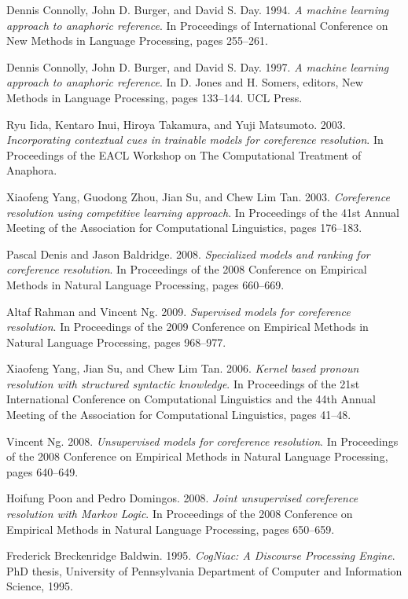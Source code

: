 \documentclass[12pt]{report}
\begin{document}
\begin{thebibliography}{30}
	Dennis Connolly, John D. Burger, and David S. Day. 1994.
	\textit{A machine learning approach to anaphoric reference}.
	In Proceedings of International Conference on New Methods in Language Processing, pages 255–261.

	Dennis Connolly, John D. Burger, and David S. Day. 1997.
	\textit{A machine learning approach to anaphoric reference}.
	In D. Jones and H. Somers, editors, New Methods in Language Processing, pages 133–144. UCL Press.

	Ryu Iida, Kentaro Inui, Hiroya Takamura, and Yuji Matsumoto. 2003.
	\textit{Incorporating contextual cues in trainable models for coreference resolution}.
	In Proceedings of the EACL Workshop on The Computational Treatment of Anaphora.

	Xiaofeng Yang, Guodong Zhou, Jian Su, and Chew Lim Tan. 2003.
	\textit{Coreference resolution using competitive learning approach}.
	In Proceedings of the 41st Annual Meeting of the Association for Computational Linguistics, pages 176–183.

	Pascal Denis and Jason Baldridge. 2008.
	\textit{Specialized models and ranking for coreference resolution}.
	In Proceedings of the 2008 Conference on Empirical Methods in Natural Language Processing, pages 660–669.

	Altaf Rahman and Vincent Ng. 2009.
	\textit{Supervised models for coreference resolution}.
	In Proceedings of the 2009 Conference on Empirical Methods in Natural Language Processing, pages 968–977.

	Xiaofeng Yang, Jian Su, and Chew Lim Tan. 2006.
	\textit{Kernel based pronoun resolution with structured syntactic knowledge}.
	In Proceedings of the 21st International Conference on Computational Linguistics and the 44th Annual Meeting of the Association
	for Computational Linguistics, pages 41–48.

	Vincent Ng. 2008.
	\textit{Unsupervised models for coreference resolution}.
	In Proceedings of the 2008 Conference on Empirical Methods in Natural Language Processing, pages 640–649.

	Hoifung Poon and Pedro Domingos. 2008.
	\textit{Joint unsupervised coreference resolution with Markov Logic}.
	In Proceedings of the 2008 Conference on Empirical Methods in Natural Language Processing, pages 650–659.

	Frederick Breckenridge Baldwin. 1995.
	\textit{CogNiac: A Discourse Processing Engine}.
	PhD thesis, University of Pennsylvania Department of Computer and Information Science, 1995.


\end{thebibliography}
\end{document}
